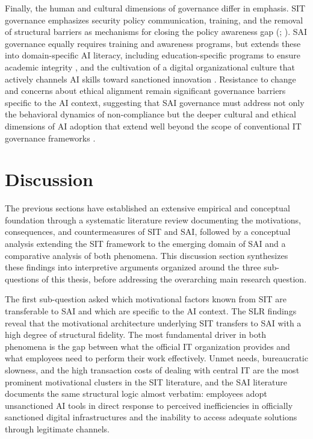 \documentclass[12pt,oneside]{article}
\begin{document}
Finally, the human and cultural dimensions of governance differ in emphasis. \ac{SIT} governance emphasizes security policy communication, training, and the removal of structural barriers as mechanisms for closing the policy awareness gap (\citealp[12]{silvius2012factors}; \citealp[279]{silic2014shadow}). \ac{SAI} governance equally requires training and awareness programs, but extends these into domain-specific \ac{AI} literacy, including education-specific programs to ensure academic integrity \citep[6]{balogun2025ethical}, and the cultivation of a digital organizational culture that actively channels \ac{AI} skills toward sanctioned innovation \citep[1]{an2024impact}. Resistance to change and concerns about ethical alignment remain significant governance barriers specific to the \ac{AI} context, suggesting that \ac{SAI} governance must address not only the behavioral dynamics of non-compliance but the deeper cultural and ethical dimensions of \ac{AI} adoption that extend well beyond the scope of conventional \ac{IT} governance frameworks \citep[1]{murire2024artificial}.

\section{Discussion} \label{discussion}

The previous sections have established an extensive empirical and conceptual foundation through a systematic literature review documenting the motivations, consequences, and countermeasures of \ac{SIT} and \ac{SAI}, followed by a conceptual analysis extending the \ac{SIT} framework to the emerging domain of \ac{SAI} and a comparative analysis of both phenomena. This discussion section synthesizes these findings into interpretive arguments organized around the three sub-questions of this thesis, before addressing the overarching main research question.

The first sub-question asked which motivational factors known from \ac{SIT} are transferable to \ac{SAI} and which are specific to the \ac{AI} context. The \ac{SLR} findings reveal that the motivational architecture underlying \ac{SIT} transfers to \ac{SAI} with a high degree of structural fidelity. The most fundamental driver in both phenomena is the gap between what the official \ac{IT} organization provides and what employees need to perform their work effectively. Unmet needs, bureaucratic slowness, and the high transaction costs of dealing with central \ac{IT} are the most prominent motivational clusters in the \ac{SIT} literature, and the \ac{SAI} literature documents the same structural logic almost verbatim: employees adopt unsanctioned \ac{AI} tools in direct response to perceived inefficiencies in officially sanctioned digital infrastructures and the inability to access adequate solutions through legitimate channels.
\end{document}

